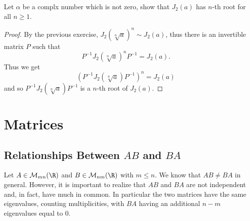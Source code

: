 \begin{exercise}
Let $\alpha$ be a complx number which is not zero, show that $J_2(a)$ has $n$-th root for all $n\geq 1$.
\end{exercise}
\begin{proof}
By the previous exercise, $J_2(\sqrt[n]{a})^n\sim J_2(a)$, thus there is an invertible matrix $P$ such that \[P^{-1}J_2(\sqrt[n]{a})^nP^{-1}=J_2(a).\] 
Thus we get
\[(P^{-1}J_2(\sqrt[n]{a})P^{-1})^n=J_2(a)\]
and so $P^{-1}J_2(\sqrt[n]{a})P^{-1}$ is a $n$-th root of $J_2(a)$.
\end{proof}
\section{Matrices}
\subsection{Relationships Between \boldmath$AB$ and \boldmath$BA$}
Let $A\in\mathcal{M}_{mn}(\R)$ and $B\in\mathcal{M}_{nm}(\R)$ with $m\leq n$. We know that $AB\neq BA$ in general. However, it is important to realize that $AB$ and $BA$ are not independent and, in fact, have much in common. In particular the two matrices have the same eigenvalues, counting multiplicities, with $BA$ having an additional $n-m$ eigenvalues equal to $0$.
